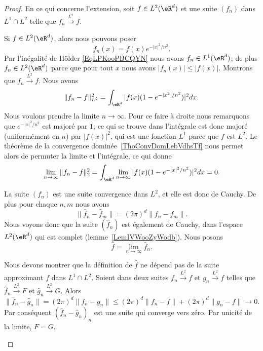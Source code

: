 \begin{proof}
	En ce qui concerne l'extension, soit \( f\in L^2(\eR^d)\) et une suite \( (f_n)\) dans \( L^1\cap L^2\) telle que \( f_n\stackrel{L^2}{\longrightarrow}f\).
	\begin{subproof}
		Si \( f\in L^2(\eR^d)\), alors nous pouvons poser
		\begin{equation}    \label{EQooHGJYooJsmxoX}
			f_n(x)=f(x) e^{-|x|^2/n^2}.
		\end{equation}
		Par l'inégalité de Hölder \eqref{EqLPKooPBCQYN} nous avons \( f_n\in L^1(\eR^d)\); de plus \( f_n\in L^2(\eR^d)\) parce que pour tout \( x\) nous avons \( | f_n(x) |\leq | f(x) |\). Montrons que \( f_n\stackrel{L^2}{\longrightarrow}f\). Nous avons
		\begin{equation}
			\| f_n-f \|_{L^2}^2=\int_{\eR^d}| f(x)(1- e^{-| x^2 |/n^2}) |^2dx.
		\end{equation}
		Nous voulons prendre la limite \( n\to \infty\). Pour ce faire à droite nous remarquons que \(  e^{-| x |^2/n^2}\) est majoré par \( 1\); ce qui se trouve dans l'intégrale est donc majoré (uniformément en \( n\)) par \( | f(x) |^2\), qui est une fonction \( L^1\) parce que \( f\) est \( L^2\). Le théorème de la convergence dominée~\ref{ThoConvDomLebVdhsTf} nous permet alors de permuter la limite et l'intégrale, ce qui donne
		\begin{equation}
			\lim_{n\to \infty} \| f_n-f \|_2^2=\int_{\eR^d}\lim_{n\to \infty} | f(x)(1- e^{-| x |^2/n^2}) |^2dx=0.
		\end{equation}


		La suite \( (f_n)\) est une suite convergence dans \( L^2\), et elle est donc de Cauchy. De plus pour chaque \( n,m\) nous avons
		\begin{equation}
			\| \hat f_n-\hat f_m \|=(2\pi)^d\| f_n-f_m \|.
		\end{equation}
		Nous voyons donc que la suite \( (\hat f_n)\) est également de Cauchy, dans l'espace \( L^2(\eR^d)\) qui est complet (lemme~\ref{LemIVWooZyWodb}). Nous posons
		\begin{equation}
			\hat f=\lim_{n\to \infty} \hat f_n.
		\end{equation}

		Nous devons montrer que la définition de \( \hat f\) ne dépend pas de la suite approximant \( f\) dans \( L^1\cap L^2\). Soient dans deux suites \( f_n\stackrel{L^2}{\longrightarrow}f\) et \( g_n\stackrel{L^2}{\longrightarrow}f\) telles que \( \hat f_n\stackrel{L^2}{\longrightarrow}F\) et \( \hat g_n\stackrel{L^2}{\longrightarrow}G\). Alors
		\begin{equation}
			\| \hat f_n-\hat g_n \|=(2\pi)^d\| f_n-g_n \|\leq (2\pi)^d\| f_n-f \|+(2\pi)^d\| g_n-f \|\to 0.
		\end{equation}
		Par conséquent \( (\hat f_n-\hat g_n)_n\) est une suite qui converge vers zéro. Par unicité de la limite, \( F=G\).
	\end{subproof}
\end{proof}

